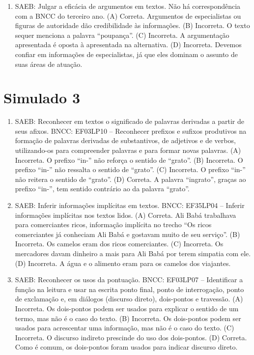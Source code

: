 \begin{enumerate}
\item
SAEB: Julgar a eficácia de argumentos em textos. Não há correspondência com a BNCC do terceiro ano. 
(A) Correta. Argumentos de especialistas ou figuras de autoridade dão credibilidade às informações. 
(B) Incorreta. O texto sequer menciona a palavra ``poupança''. 
(C) Incorreta. A argumentação apresentada é oposta à apresentada na alternativa. 
(D) Incorreta. Devemos confiar em informações de especialistas, já que eles dominam o assunto de suas áreas de atuação.
\end{enumerate}

\section*{Simulado 3}

\begin{enumerate}
\item
SAEB: Reconhecer em textos o significado de palavras derivadas a partir de seus afixos.
BNCC: EF03LP10 -- Reconhecer prefixos e sufixos produtivos na formação de
palavras derivadas de substantivos, de adjetivos e de verbos,
utilizando-os para compreender palavras e para formar novas palavras.
(A) Incorreta. O prefixo ``in-'' não reforça o sentido de ``grato''.
(B) Incorreta. O prefixo ``in-'' não ressalta o sentido de ``grato''.
(C) Incorreta. O prefixo ``in-'' não reitera o sentido de ``grato''.
(D) Correta. A palavra ``ingrato'', graças ao prefixo ``in-'', tem sentido contrário ao da palavra ``grato''.

\item
SAEB: Inferir informações implícitas em textos.
BNCC: EF35LP04 -- Inferir informações implícitas nos textos lidos.
(A) Correta. Ali Babá trabalhava para comerciantes ricos, informação
implícita no trecho ``Os ricos comerciantes já conheciam Ali Babá e
gostavam muito de seu serviço''.
(B) Incorreta. Os camelos eram dos ricos comerciantes.
(C) Incorreta. Os mercadores davam dinheiro a mais para Ali Babá por
terem simpatia com ele.
(D) Incorreta. A água e o alimento eram para os camelos dos viajantes.

\item
SAEB: Reconhecer os usos da pontuação.
BNCC: EF03LP07 -- Identificar a função na leitura e usar na escrita ponto final, ponto
de interrogação, ponto de exclamação e, em diálogos (discurso direto), dois-pontos e
travessão.
(A) Incorreta. Os dois-pontos podem ser usados para explicar o sentido de um termo, mas não é o caso do texto.
(B) Incorreta. Os dois-pontos podem ser usados para acrescentar uma informação, mas não é o caso do texto.
(C) Incorreta. O discurso indireto prescinde do uso dos dois-pontos.
(D) Correta. Como é comum, os dois-pontos foram usados para indicar discurso direto.


\end{enumerate}
